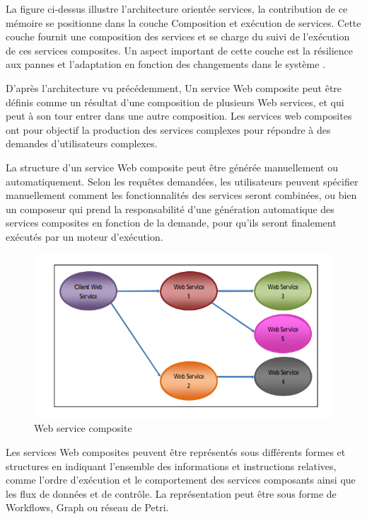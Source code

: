La figure ci-dessus illustre l'architecture orientée services, la contribution de ce mémoire se positionne dans la couche Composition et exécution de services.
Cette couche fournit une composition des services et se charge du suivi de l’exécution de ces services composites. Un aspect important de cette couche est la résilience aux pannes et l’adaptation en fonction des changements dans le système \cite{1}.

D'après l'architecture vu précédemment, Un service Web composite peut être définis comme un  résultat d’une composition de plusieurs Web services, et qui peut à son tour entrer dans une autre composition.
Les  services web composites ont pour objectif  la production des services complexes pour répondre à des demandes d’utilisateurs complexes. 

La structure d’un service Web composite peut être générée manuellement ou automatiquement. Selon les requêtes demandées, les utilisateurs peuvent spécifier manuellement comment les fonctionnalités des services seront combinées, ou bien un composeur qui prend la responsabilité d’une génération automatique des services composites en fonction de la demande, pour qu’ils seront finalement exécutés par un moteur d’exécution.


\begin{figure}[H]
\begin{center}
\includegraphics[width=1\linewidth]{images/CWS.jpg}
\end{center}
\caption{Web service composite}
\label{fig:2}
\end{figure}


Les services Web composites peuvent être représentés sous différents formes et structures en indiquant l’ensemble des informations et instructions relatives, comme l’ordre d’exécution et le comportement des services composants ainsi que les flux de données  et de contrôle.
La représentation peut être sous forme de Workflows, Graph ou réseau de Petri.

